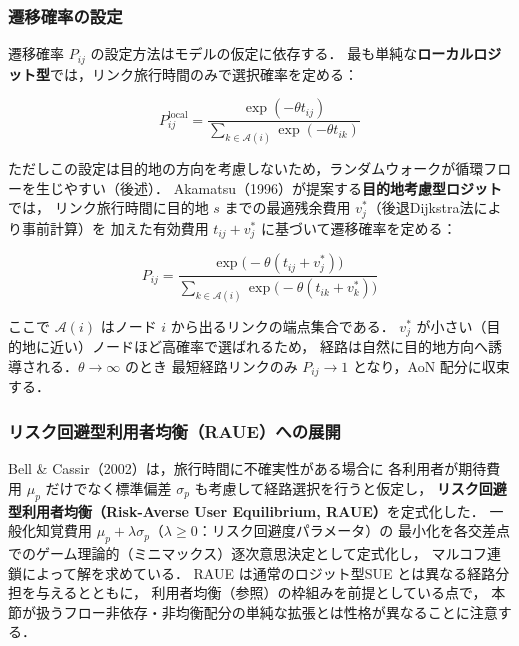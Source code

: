 \subsubsection*{遷移確率の設定}

遷移確率 $P_{ij}$ の設定方法はモデルの仮定に依存する．
最も単純な\textbf{ローカルロジット型}では，リンク旅行時間のみで選択確率を定める：

\begin{equation}
  P_{ij}^{\mathrm{local}} = \frac{\exp(-\theta t_{ij})}{\displaystyle\sum_{k \in \mathcal{A}(i)} \exp(-\theta t_{ik})}
  \label{eq:markov-logit-local}
\end{equation}

ただしこの設定は目的地の方向を考慮しないため，ランダムウォークが循環フローを生じやすい（後述）．
Akamatsu（1996）が提案する\textbf{目的地考慮型ロジット}では，
リンク旅行時間に目的地 $s$ までの最適残余費用 $v^*_j$（後退Dijkstra法により事前計算）を
加えた有効費用 $t_{ij} + v^*_j$ に基づいて遷移確率を定める：

\begin{equation}
  P_{ij} = \frac{\exp\bigl(-\theta(t_{ij} + v^*_j)\bigr)}{\displaystyle\sum_{k \in \mathcal{A}(i)} \exp\bigl(-\theta(t_{ik} + v^*_k)\bigr)}
  \label{eq:markov-logit}
\end{equation}

ここで $\mathcal{A}(i)$ はノード $i$ から出るリンクの端点集合である．
$v^*_j$ が小さい（目的地に近い）ノードほど高確率で選ばれるため，
経路は自然に目的地方向へ誘導される．$\theta \to \infty$ のとき
最短経路リンクのみ $P_{ij} \to 1$ となり，AoN 配分に収束する．

\subsubsection*{リスク回避型利用者均衡（RAUE）への展開}

Bell \& Cassir（2002）は，旅行時間に不確実性がある場合に
各利用者が期待費用 $\mu_p$ だけでなく標準偏差 $\sigma_p$ も考慮して経路選択を行うと仮定し，
\textbf{リスク回避型利用者均衡（Risk-Averse User Equilibrium, RAUE）}を定式化した\cite{Bell2002}．
一般化知覚費用 $\mu_p + \lambda\sigma_p$（$\lambda \geq 0$：リスク回避度パラメータ）の
最小化を各交差点でのゲーム理論的（ミニマックス）逐次意思決定として定式化し，
マルコフ連鎖によって解を求めている．
RAUE は通常のロジット型SUE とは異なる経路分担を与えるとともに，
利用者均衡（参照）の枠組みを前提としている点で，
本節が扱うフロー非依存・非均衡配分の単純な拡張とは性格が異なることに注意する．

